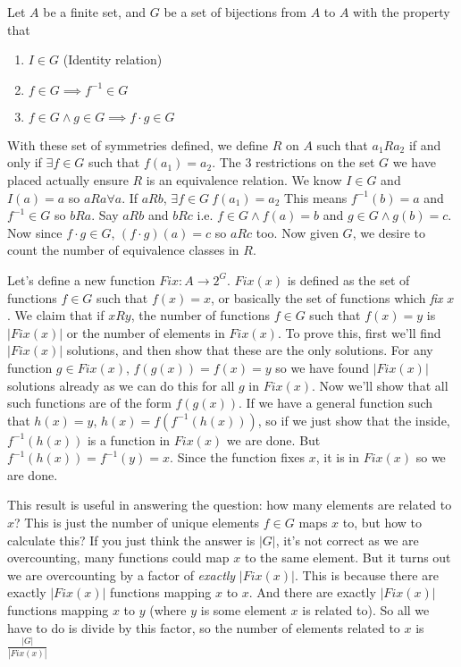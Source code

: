 \documentclass[a4paper,10pt]{article}
\theoremstyle{definition} %
\begin{document}
    Let $A$ be a finite set, and $G$ be a set of bijections from $A$ to $A$ with the property that
    \begin{enumerate}
        \item $I \in G$ (Identity relation)
        \item $f \in G \implies f^{-1} \in G$
        \item $f \in G \land g \in G \implies f \cdot g \in G$
    \end{enumerate}
    With these set of symmetries defined, we define $R$ on $A$ such that $a_1Ra_2$ if and only if $\exists f \in G$ such that $f(a_1) = a_2$. The 3 restrictions
    on the set $G$ we have placed actually ensure $R$ is an equivalence relation. We know $I \in G$ and $I(a) = a$ so $aRa \forall a$. If $aRb$, $\exists f \in G \ f(a_1) = a_2$
    This means $f^{-1}(b) = a$ and $f^{-1} \in G$ so $bRa$. Say $aRb$ and $bRc$ i.e. $f \in G \land f(a) = b$ and $g \in G \land g(b) = c$. Now since $f \cdot g \in G$,
    $(f \cdot g)(a) = c$ so $aRc$ too. Now given $G$, we desire to count the number of equivalence classes in $R$.

    Let's define a new function $Fix : A \rightarrow 2^G$. $Fix(x)$ is defined as the set of functions $f \in G$ such that $f(x) = x$, or basically the set of functions
    which \emph{fix} $x$. We claim that if $xRy$, the number of functions $f \in G$ such that $f(x) = y$ is $|Fix(x)|$ or the number of elements in $Fix(x)$. To prove this, 
    first we'll find $|Fix(x)|$ solutions, and then show that these are the only solutions. For any function $g \in Fix(x)$, $f(g(x)) = f(x) = y$ so we have found $|Fix(x)|$
    solutions already as we can do this for all $g$ in $Fix(x)$. Now we'll show that all such functions are of the form $f(g(x))$. If we have a general function such that $h(x) = y$,
    $h(x) = f(f^{-1}(h(x)))$, so if we just show that the inside, $f^{-1}(h(x))$ is a function in $Fix(x)$ we are done. But $f^{-1}(h(x)) = f^{-1}(y) = x$. Since the function 
    fixes $x$, it is in $Fix(x)$ so we are done.

    This result is useful in answering the question: how many elements are related to $x$? This is just the number of unique elements $f \in G$ maps $x$ to, but how to calculate this?
    If you just think the answer is $|G|$, it's not correct as we are overcounting, many functions could map $x$ to the same element. But it turns out we are overcounting by a factor 
    of \emph{exactly} $|Fix(x)|$. This is because there are exactly $|Fix(x)|$ functions mapping $x$ to $x$. And there are exactly $|Fix(x)|$ functions mapping $x$ to $y$ (where $y$ is 
    some element $x$ is related to). So all we have to do is divide by this factor, so the number of elements related to $x$ is $\frac{|G|}{|Fix(x)|}$
\end{document}
